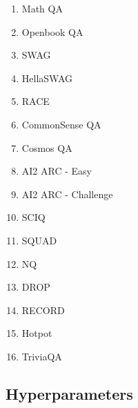\documentclass[11pt,a4paper]{article}
\begin{document}
\begin{enumerate}
    \item Math QA \cite{mathqa}
    \item Openbook QA \citep{openbookqa}
    \item SWAG \cite{swag}
    \item HellaSWAG \cite{hellaswag}
    \item RACE \cite{race}
    \item CommonSense QA \cite{commonsenseqa}
    \item Cosmos QA \cite{cosmosqa}
    \item AI2 ARC - Easy \cite{arc}
    \item AI2 ARC - Challenge \cite{arc}
    \item SCIQ \cite{sciq}
    \item SQUAD \cite{SQUAD}
    \item NQ \cite{NaturalQuestions}
    \item DROP \cite{DROP}
    \item RECORD \cite{RECORD}
    \item Hotpot \cite{HotpotQA}
    \item TriviaQA \cite{TriviaQA}
    
\end{enumerate}
\label{sec:appendix_dataset}

\subsection{Hyperparameters}
\label{sec:appendix_hp}
\end{document}
